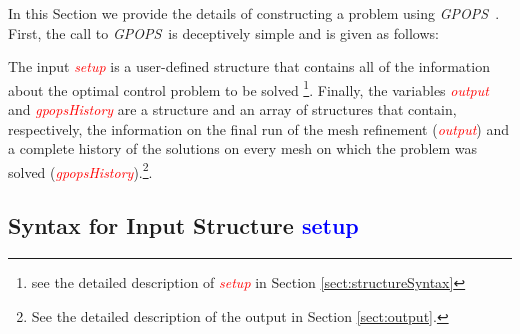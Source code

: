 \documentclass[10pt]{article}
\newcommand{\gpops}{{\em GPOPS}~}
\newcommand{\bfblue}[1]{\textcolor{blue}{\bf #1}}
\newcommand{\slred}[1]{\textcolor{red}{\sl #1}}
\begin{document}
In this Section we provide the details of constructing a problem using
\gpops.  First, the call to \gpops is deceptively simple and is given as follows:
\begin{center}
\end{center}
The input \slred{setup} is a user-defined structure that contains all
of the information about the optimal control problem to be solved
\footnote{see the detailed description of \slred{setup} in Section
\ref{sect:structureSyntax}}.  Finally, the variables \slred{output}
and \slred{gpopsHistory} are a structure and an array of structures
that contain, respectively,  the information on the final run of the
mesh refinement (\slred{output}) and a complete history of the
solutions on every mesh on which the problem was solved
(\slred{gpopsHistory}).\footnote{See the detailed description of the output in Section \ref{sect:output}.}.  

\subsection{Syntax for Input Structure \bfblue{setup}  \label{sect:structureSyntax}}
\end{document}
